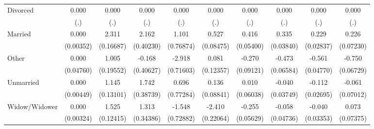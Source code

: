 {\begin{tabular}{l*{9}{c}}
Divorced            &       0.000         &       0.000         &       0.000         &       0.000         &       0.000         &       0.000         &       0.000         &       0.000         &       0.000         \\
                    &         (.)         &         (.)         &         (.)         &         (.)         &         (.)         &         (.)         &         (.)         &         (.)         &         (.)         \\
Married             &       0.000         &       2.311\sym{***}&       2.162\sym{***}&       1.101         &       0.527\sym{***}&       0.416\sym{***}&       0.335\sym{***}&       0.229\sym{***}&       0.226\sym{**} \\
                    &   (0.00352)         &   (0.16687)         &   (0.40230)         &   (0.76874)         &   (0.08475)         &   (0.05400)         &   (0.03840)         &   (0.02837)         &   (0.07230)         \\
Other               &       0.000         &       1.005\sym{***}&      -0.168         &      -2.918\sym{***}&       0.081         &      -0.270\sym{**} &      -0.473\sym{***}&      -0.561\sym{***}&      -0.750\sym{***}\\
                    &   (0.04760)         &   (0.19552)         &   (0.40627)         &   (0.71603)         &   (0.12357)         &   (0.09121)         &   (0.06584)         &   (0.04770)         &   (0.06729)         \\
Unmarried           &       0.000         &       1.145\sym{***}&       1.742\sym{***}&       0.696         &       0.136         &       0.010         &      -0.040         &      -0.112\sym{***}&      -0.061         \\
                    &   (0.00449)         &   (0.13101)         &   (0.38739)         &   (0.77284)         &   (0.08841)         &   (0.06038)         &   (0.03749)         &   (0.02695)         &   (0.07012)         \\
Widow/Widower       &       0.000         &       1.525\sym{***}&       1.313\sym{***}&      -1.548\sym{*}  &      -2.410\sym{***}&      -0.255\sym{***}&      -0.058         &      -0.040         &       0.073         \\
                    &   (0.00324)         &   (0.12415)         &   (0.34386)         &   (0.72882)         &   (0.22064)         &   (0.05629)         &   (0.04736)         &   (0.03353)         &   (0.07375)         \\

\end{tabular}}
